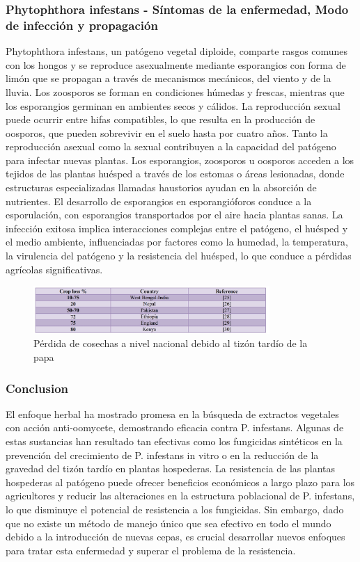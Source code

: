    \subsubsection{Phytophthora infestans - Síntomas de la enfermedad, Modo de infección y propagación}
 Phytophthora infestans, un patógeno vegetal diploide, comparte rasgos comunes con los hongos y se reproduce asexualmente mediante esporangios con forma de limón que se propagan a través de mecanismos mecánicos, del viento y de la lluvia. Los zoosporos se forman en condiciones húmedas y frescas, mientras que los esporangios germinan en ambientes secos y cálidos. La reproducción sexual puede ocurrir entre hifas compatibles, lo que resulta en la producción de oosporos, que pueden sobrevivir en el suelo hasta por cuatro años. Tanto la reproducción asexual como la sexual contribuyen a la capacidad del patógeno para infectar nuevas plantas. Los esporangios, zoosporos u oosporos acceden a los tejidos de las plantas huésped a través de los estomas o áreas lesionadas, donde estructuras especializadas llamadas haustorios ayudan en la absorción de nutrientes. El desarrollo de esporangios en esporangióforos conduce a la esporulación, con esporangios transportados por el aire hacia plantas sanas. La infección exitosa implica interacciones complejas entre el patógeno, el huésped y el medio ambiente, influenciadas por factores como la humedad, la temperatura, la virulencia del patógeno y la resistencia del huésped, lo que conduce a pérdidas agrícolas significativas.
 
 	\begin{figure}[H]
 	\begin{center}
 		\includegraphics[width=0.8\textwidth]{2/figures/prom1.jpeg}
 		\caption{Pérdida de cosechas a nivel nacional debido al tizón tardío de la papa}
 		\label{}
 	\end{center}
 	
 \end{figure}
 
    \subsubsection{Conclusion}
    El enfoque herbal ha mostrado promesa en la búsqueda de extractos vegetales con acción anti-oomycete, demostrando eficacia contra P. infestans. Algunas de estas sustancias han resultado tan efectivas como los fungicidas sintéticos en la prevención del crecimiento de P. infestans in vitro o en la reducción de la gravedad del tizón tardío en plantas hospederas. La resistencia de las plantas hospederas al patógeno puede ofrecer beneficios económicos a largo plazo para los agricultores y reducir las alteraciones en la estructura poblacional de P. infestans, lo que disminuye el potencial de resistencia a los fungicidas. Sin embargo, dado que no existe un método de manejo único que sea efectivo en todo el mundo debido a la introducción de nuevas cepas, es crucial desarrollar nuevos enfoques para tratar esta enfermedad y superar el problema de la resistencia.